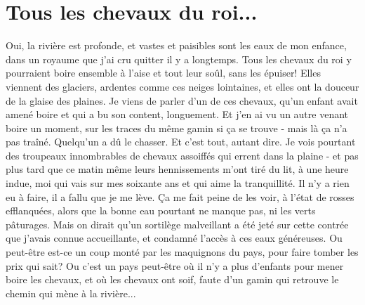 \section{Tous les chevaux du roi...}

Oui, la rivière est profonde, et vastes et paisibles sont les eaux de mon enfance, dans un royaume que j'ai cru quitter il y a longtemps. Tous les chevaux du roi y pourraient boire ensemble à l'aise et tout leur soûl, sans les épuiser! Elles viennent des glaciers, ardentes comme ces neiges lointaines, et elles ont la douceur de la glaise des plaines. Je viens de parler d'un de ces chevaux, qu'un enfant avait amené boire et qui a bu son content, longuement. Et j'en ai vu un autre venant boire un moment, sur les traces du même gamin si ça se trouve - mais là ça n'a pas traîné. Quelqu'un a dû le chasser. Et c'est tout, autant dire. Je vois pourtant des troupeaux innombrables de chevaux assoiffés qui errent dans la plaine - et pas plus tard que ce matin même leurs hennissements m'ont tiré du lit, à une heure indue, moi qui vais sur mes soixante ans et qui aime la tranquillité. Il n'y a rien eu à faire, il a fallu que je me lève. Ça me fait peine de les voir, à l'état de rosses efflanquées, alors que la bonne eau pourtant ne manque pas, ni les verts pâturages. Mais on dirait qu'un sortilège malveillant a été jeté sur cette contrée que j'avais connue accueillante, et condamné l'accès à ces eaux généreuses. Ou peut-être est-ce un coup monté par les maquignons du pays, pour faire tomber les prix qui sait? Ou c'est un pays peut-être où il n'y a plus d'enfants pour mener boire les chevaux, et où les chevaux ont soif, faute d'un gamin qui retrouve le chemin qui mène à la rivière...


